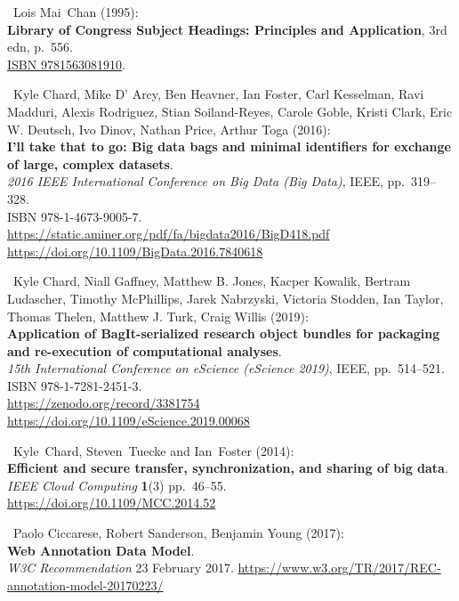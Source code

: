 \begin{thebibliography}{9}
~Lois Mai~Chan (1995):\\
\textbf{Library of Congress Subject Headings: Principles and
Application}, 3rd edn, p.~556.\\
\href{https://identifiers.org/isbn/9781563081910}{ISBN 9781563081910}.

~Kyle Chard, Mike D' Arcy, Ben Heavner, Ian Foster, Carl
Kesselman, Ravi Madduri, Alexis Rodriguez, Stian Soiland-Reyes, Carole
Goble, Kristi Clark, Eric W. Deutsch, Ivo Dinov, Nathan Price, Arthur
Toga (2016):\\
\textbf{I'll take that to go: Big data bags and minimal identifiers for
exchange of large, complex datasets}.\\
\emph{2016 IEEE International Conference on Big Data (Big Data)}, IEEE,
pp.~319--328.\\
ISBN 978-1-4673-9005-7.\\
\url{https://static.aminer.org/pdf/fa/bigdata2016/BigD418.pdf}~\\
\url{https://doi.org/10.1109/BigData.2016.7840618}

~Kyle Chard, Niall Gaffney, Matthew B. Jones, Kacper Kowalik,
Bertram Ludascher, Timothy McPhillips, Jarek Nabrzyski, Victoria
Stodden, Ian Taylor, Thomas Thelen, Matthew J. Turk, Craig Willis
(2019):\\
\textbf{Application of BagIt-serialized research object bundles for
packaging and re-execution of computational analyses}.\\
\emph{15th International Conference on eScience (eScience 2019)}, IEEE,
pp.~514--521.\\
ISBN 978-1-7281-2451-3.\\
\url{https://zenodo.org/record/3381754}~\\
\url{https://doi.org/10.1109/eScience.2019.00068}

~Kyle~Chard, Steven~Tuecke and Ian~Foster (2014):\\
\textbf{Efficient and secure transfer, synchronization, and sharing of
big data}.\\
\emph{IEEE Cloud Computing} \textbf{1}(3) pp.~46--55.\\
\url{https://doi.org/10.1109/MCC.2014.52}

~Paolo Ciccarese, Robert Sanderson, Benjamin Young (2017):\\
\textbf{Web Annotation Data Model}.\\
\emph{W3C Recommendation} 23 February 2017.
\url{https://www.w3.org/TR/2017/REC-annotation-model-20170223/}


\end{thebibliography}
